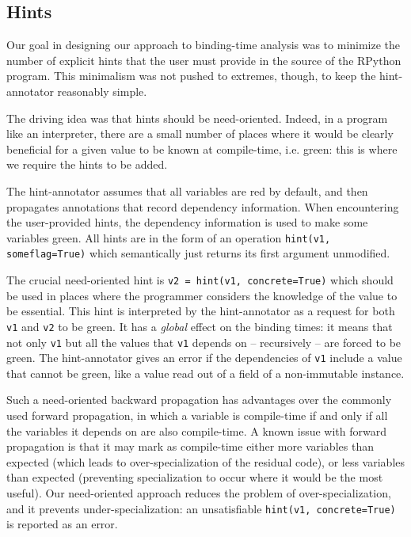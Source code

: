 \subsection{Hints}
\label{sec:hints}

Our goal in designing our approach to binding-time analysis was to
minimize the number of explicit hints that the user must provide in
the source of the RPython program.  This minimalism was not pushed to
extremes, though, to keep the hint-annotator reasonably simple.  

The driving idea was that hints should be need-oriented.  Indeed, in a
program like an interpreter, there are a small number of places where it
would be clearly beneficial for a given value to be known at
compile-time, i.e. green: this is where we require the hints to be
added.

The hint-annotator assumes that all variables are red by default, and
then propagates annotations that record dependency information.
When encountering the user-provided hints, the dependency information
is used to make some variables green.  All
hints are in the form of an operation \texttt{hint(v1, someflag=True)}
which semantically just returns its first argument unmodified.

The crucial need-oriented hint is \texttt{v2 = hint(v1, concrete=True)}
which should be used in places where the programmer considers the
knowledge of the value to be essential.  This hint is interpreted by
the hint-annotator as a request for both \texttt{v1} and \texttt{v2} to be green.  It
has a \emph{global} effect on the binding times: it means that not only
\texttt{v1} but all the values that \texttt{v1} depends on – recursively –
are forced to be green.  The hint-annotator gives an error if the
dependencies of \texttt{v1} include a value that cannot be green, like
a value read out of a field of a non-immutable instance.

Such a need-oriented backward propagation has advantages over the
commonly used forward propagation, in which a variable is compile-time
if and only if all the variables it depends on are also compile-time.  A
known issue with forward propagation is that it may mark as compile-time
either more variables than expected (which leads to over-specialization
of the residual code), or less variables than expected (preventing
specialization to occur where it would be the most useful).  Our
need-oriented approach reduces the problem of over-specialization, and
it prevents under-specialization: an unsatisfiable \texttt{hint(v1,
concrete=True)} is reported as an error.

